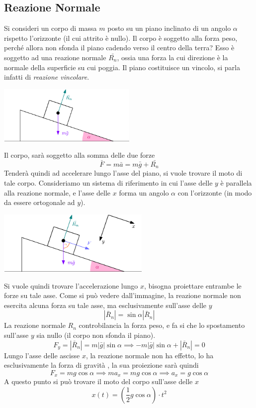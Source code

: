 \documentclass[10pt, letterpaper]{report}
\begin{document}
\subsection{Reazione Normale}
Si consideri un corpo di massa $m$ posto su un piano inclinato di un angolo $\alpha$ rispetto 
l'orizzonte (il cui attrito è nullo). Il corpo è soggetto alla forza peso, perché allora non sfonda il piano cadendo verso il 
centro della terra? Esso è soggetto ad una reazione normale $\bar{R_n}$, ossia una forza la cui direzione è la normale 
della superficie su cui poggia. Il piano costituisce un vincolo, si parla infatti di \textit{reazione vincolare}.
\begin{center}
    \includegraphics[width=0.5\textwidth]{images/reazionenormale.eps}
\end{center}
Il corpo, sarà soggetto alla somma delle due forze 
$$ \bar F = m\bar a = m\bar g + \bar{R_n}$$
Tenderà quindi ad accelerare lungo l'asse del piano, si vuole trovare il moto di tale corpo. Consideriamo un 
sistema di riferimento in cui l'asse delle $y$ è parallela alla reazione normale, e l'asse delle $x$ 
forma un angolo $\alpha$ con l'orizzonte (in modo da essere ortogonale ad $y$).
\begin{center}
    \includegraphics[width=0.55\textwidth]{images/reazionenormale2.eps}
\end{center}
Si vuole quindi trovare l'accelerazione lungo $x$, bisogna proiettare entrambe le forze su tale asse. 
Come si può vedere dall'immagine, la reazione normale non esercita alcuna forza su tale asse, ma esclusivamente sull'asse 
delle $y$ 
$$ |\bar R_n|=\sin\alpha|\bar R_n| $$
La reazione normale $R_n$ controbilancia la forza peso, e fa si che lo spostamento sull'asse $y$ sia nullo (il corpo non sfonda il piano). 
$$ F_y=
|\bar R_n|=m|\bar g|\sin \alpha \implies
-m|\bar g|\sin \alpha +|\bar R_n|=0$$
Lungo l'asse delle ascisse $x$, la reazione normale non ha effetto, lo ha esclusivamente la forza di gravità , la sua proiezione sarà quindi
$$ F_x=mg\cos\alpha\implies ma_x=mg\cos\alpha\implies a_x=g\cos\alpha$$
A questo punto si può trovare il moto del corpo sull'asse delle $x$
$$ x(t)=(\frac{1}{2}g\cos\alpha)\cdot t^2$$
\end{document}
